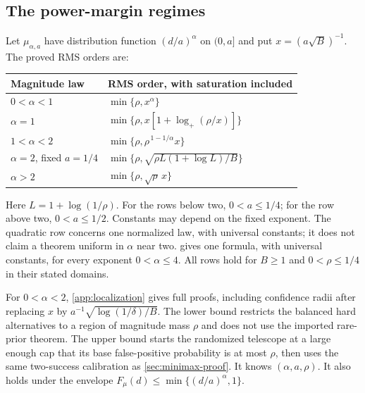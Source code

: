 \subsection{The power-margin regimes}
Let $\mu_{\alpha,a}$ have distribution function $(d/a)^\alpha$ on
$(0,a]$ and put $x=(a\sqrt B)^{-1}$. The proved RMS orders are:
\begin{center}
\renewcommand{\arraystretch}{1.4}
\begin{tabular}{@{}ll@{}}
\toprule
Magnitude law & RMS order, with saturation included\\
\midrule
$0<\alpha<1$ & $\min\{\rho,x^\alpha\}$\\
$\alpha=1$ & $\min\{\rho,x[1+\log_+(\rho/x)]\}$\\
$1<\alpha<2$ & $\min\{\rho,\rho^{\,1-1/\alpha}x\}$\\
$\alpha=2$, fixed $a=1/4$
 & $\min\{\rho,\sqrt{\rho L(1+\log L)/B}\}$\\
$\alpha>2$ & $\min\{\rho,\sqrt\rho\,x\}$\\
\bottomrule
\end{tabular}
\end{center}
Here $L=1+\log(1/\rho)$. For the rows below two, $0<a\le1/4$;
for the row above two, $0<a\le1/2$. Constants may depend on the fixed
exponent. The quadratic row concerns one normalized law, with universal
constants; it does not claim a theorem uniform in $\alpha$ near two.
 gives one formula, with universal constants, for
every exponent $0<\alpha\le4$.
All rows hold for $B\ge1$ and $0<\rho\le1/4$ in their stated domains.

For $0<\alpha<2$, \cref{app:localization} gives full proofs, including
confidence radii after replacing $x$ by
$a^{-1}\sqrt{\log(1/\delta)/B}$. The lower bound restricts the balanced
hard alternatives to a region of magnitude mass $\rho$ and does not
use the imported rare-prior theorem. The upper bound starts the
randomized telescope at a large enough cap that its base false-positive
probability is at most $\rho$, then uses the same two-success
calibration as \cref{sec:minimax-proof}. It knows $(\alpha,a,\rho)$.
It also holds under the envelope
$F_\mu(d)\le\min\{(d/a)^\alpha,1\}$.

